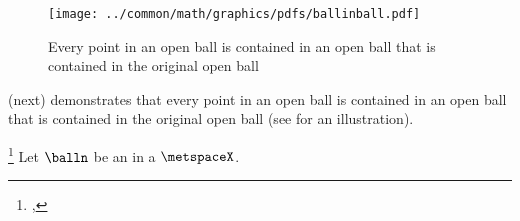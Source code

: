 %

\begin{figure}[th]
  \centering
  \texttt{[image: ../common/math/graphics/pdfs/ballinball.pdf]}
  \caption[Every point in an   is contained in an {open ball} that is contained in the original open ball]{
  Every point in an open ball is contained in an open ball that is contained in the original open ball
  \label{fig:ms_openball_openset}
  }
\end{figure}
 (next) demonstrates that 
every point in an open ball is contained in an open ball that is contained in the original open ball
(see  for an illustration).
\begin{lemma}
\label{lem:openball_openset}
\footnote{
  ,
  }
Let $\balln$ be an   in a  $\metspaceX$.
\end{lemma}
